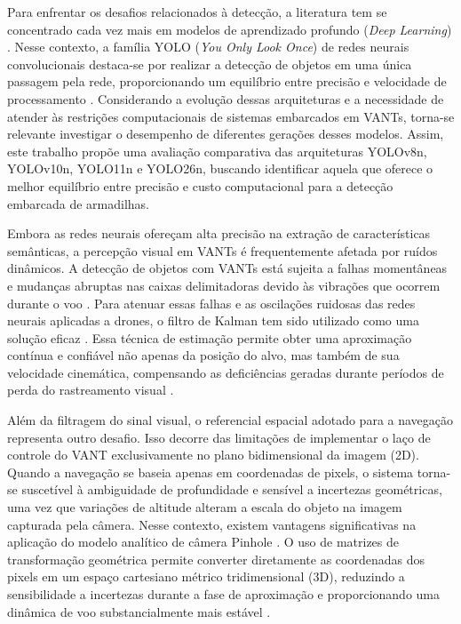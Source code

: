 Para enfrentar os desafios relacionados à detecção, a literatura tem se concentrado cada vez mais em modelos de aprendizado profundo (\textit{Deep Learning}) \cite{amjoud2023}. Nesse contexto, a família YOLO (\textit{You Only Look Once}) de redes neurais convolucionais destaca-se por realizar a detecção de objetos em uma única passagem pela rede, proporcionando um equilíbrio entre precisão e velocidade de processamento \cite{afifah2025, amjoud2023, adegun2024}. Considerando a evolução dessas arquiteturas e a necessidade de atender às restrições computacionais de sistemas embarcados em VANTs, torna-se relevante investigar o desempenho de diferentes gerações desses modelos. Assim, este trabalho propõe uma avaliação comparativa das arquiteturas YOLOv8n, YOLOv10n, YOLO11n e YOLO26n, buscando identificar aquela que oferece o melhor equilíbrio entre precisão e custo computacional para a detecção embarcada de armadilhas.

Embora as redes neurais ofereçam alta precisão na extração de características semânticas, a percepção visual em VANTs é frequentemente afetada por ruídos dinâmicos. A detecção de objetos com VANTs está sujeita a falhas momentâneas e mudanças abruptas nas caixas delimitadoras devido às vibrações que ocorrem durante o voo \cite{barisic2019}. Para atenuar essas falhas e as oscilações ruidosas das redes neurais aplicadas a drones, o filtro de Kalman tem sido utilizado como uma solução eficaz \cite{barisic2019}. Essa técnica de estimação permite obter uma aproximação contínua e confiável não apenas da posição do alvo, mas também de sua velocidade cinemática, compensando as deficiências geradas durante períodos de perda do rastreamento visual \cite{barisic2019}.

Além da filtragem do sinal visual, o referencial espacial adotado para a navegação representa outro desafio. Isso decorre das limitações de implementar o laço de controle do VANT exclusivamente no plano bidimensional da imagem (2D). Quando a navegação se baseia apenas em coordenadas de pixels, o sistema torna-se suscetível à ambiguidade de profundidade e sensível a incertezas geométricas, uma vez que variações de altitude alteram a escala do objeto na imagem capturada pela câmera. Nesse contexto, existem vantagens significativas na aplicação do modelo analítico de câmera Pinhole \cite{thuilot2002, fagundes2025}. O uso de matrizes de transformação geométrica permite converter diretamente as coordenadas dos pixels em um espaço cartesiano métrico tridimensional (3D), reduzindo a sensibilidade a incertezas durante a fase de aproximação e proporcionando uma dinâmica de voo substancialmente mais estável \cite{fagundes2025}.

